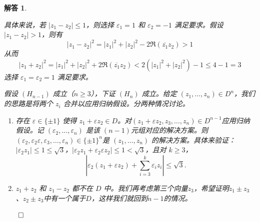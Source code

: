 \documentclass[12pt,UTF8,fontset=none]{ctexbook}
\theoremstyle{exercisestyle}
\theoremstyle{solutionstyle}
\newtheorem*{solution*}{解答}
\newenvironment{solution}
  {\begin{solution*}}
  {\hfill\ensuremath{\qed}\end{solution*}}
\begin{document}
\begin{solution}
\begin{subquestions}
\begin{minipage}[t]{0.4\textwidth}
\end{minipage}

具体来说，若 \( |z_1 - z_2| \leqslant 1 \)，则选择 \( \varepsilon_1 = 1 \) 和 \( \varepsilon_2 = -1 \) 满足要求。假设 \( |z_1 - z_2| > 1 \)，则有
\[
|z_1 - z_2|^2 = |z_1|^2 + |z_2|^2 - 2 \Re(\overline{z_1} z_2) > 1
\]
从而
\[
|z_1 + z_2|^2 = |z_1|^2 + |z_2|^2 + 2 \Re(\overline{z_1} z_2) < 2(|z_1|^2 + |z_2|^2) - 1 \leqslant 4 - 1 = 3
\]
选择 \( \varepsilon_1 = \varepsilon_2 = 1 \) 满足要求。


假设 \( (H_{n-1}) \) 成立（\( n \geq 3 \)），下证 \( (H_{n}) \) 成立。给定 \( (z_1, \ldots, z_n) \in D^n \)，我们的思路是将两个 \( z_i \) 合并以应用归纳假设。分两种情况讨论。
\begin{enumerate}[label=\arabic*.]
  \item 存在 \( \varepsilon \in \{\pm 1\} \) 使得 \( z_1 + \varepsilon z_2 \in D \)。对\( (z_1 + \varepsilon z_2, z_3, \ldots, z_n) \in D^{n-1} \)应用归纳假设。记 \( (\varepsilon_2, \ldots, \varepsilon_n) \) 是该 \( (n-1) \)元组对应的解决方案。则 \( (\varepsilon_2, \varepsilon_2 \varepsilon, \varepsilon_3, \ldots, \varepsilon_n) \in \{\pm 1\}^n \)是 \( (z_1, \ldots, z_n) \) 的解决方案。具体来验证：\( |\varepsilon_2 z_1| \leqslant 1 \leqslant \sqrt{3} \)，\( |\varepsilon_2 z_1 + \varepsilon_2 \varepsilon z_2| \leqslant 1 < \sqrt{3} \)，且对 \( k \geqslant 3 \)，
    \[
    \left| \varepsilon_2(z_1 + \varepsilon z_2) + \sum_{i=3}^k \varepsilon_i z_i \right| \leqslant \sqrt{3}.
    \]
  \item \( z_1 + z_2 \) 和 \( z_1 - z_2 \) 都不在 \( D \) 中。我们再考虑第三个向量$z_3$，希望证明\( z_1 \pm z_3 \)、\( z_2 \pm z_3 \)中有一个属于$D$，这样我们就回到$n-1$的情况。

\vspace{4pt}
\begin{minipage}[t]{0.4\textwidth}
\centering
{}
\end{minipage}
\end{enumerate}
\end{subquestions}
\end{solution}
\end{document}
